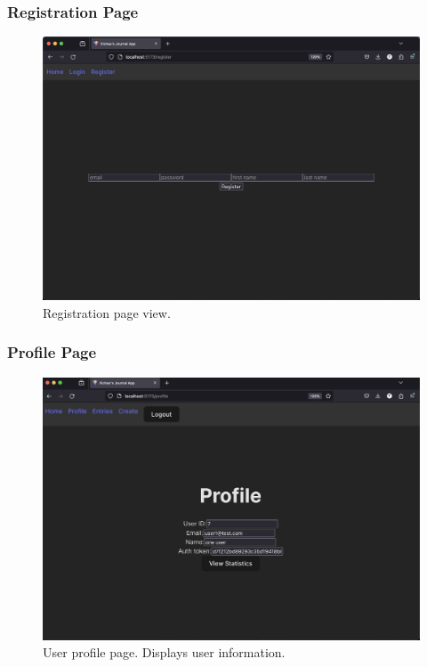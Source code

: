 \subsubsection{Registration Page}
\begin{figure}[H]
\centering
\includegraphics[width=\linewidth]{Assets/UI-register.png}
\caption{Registration page view.}
\label{fig:uiregister}
\end{figure}

\subsubsection{Profile Page}
\begin{figure}[H]
\centering
\includegraphics[width=\linewidth]{Assets/UI-profile.png}
\caption{User profile page. Displays user information.}
\label{fig:uiprofile}
\end{figure}


